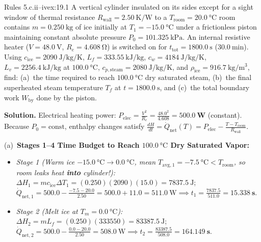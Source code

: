 \begin{workedexample}{Rules 5.c.ii--iv}{ex:19.1}
A vertical cylinder insulated on its sides except for a sight window of thermal resistance $R_{\mathrm{wall}} = \SI{2.50}{\kelvin\per\watt}$ to a $T_{\mathrm{room}} = \SI{20.0}{\celsius}$ room contains $m = \SI{0.250}{\kilogram}$ of ice initially at $T_1 = \SI{-15.0}{\celsius}$ under a frictionless piston maintaining constant absolute pressure $P_0 = \SI{101.325}{\kilo\pascal}$. An internal resistive heater ($V = \SI{48.0}{\volt}$, $R_e = \SI{4.608}{\ohm}$) is switched on for $t_{\mathrm{tot}} = \SI{1800.0}{\second}$ ($\SI{30.0}{\minute}$). Using $c_{\mathrm{ice}} = \SI{2090}{\joule\per\kilogram\per\kelvin}$, $L_f = \SI{333.55}{\kilo\joule\per\kilogram}$, $c_w = \SI{4184}{\joule\per\kilogram\per\kelvin}$, $L_v = \SI{2256.4}{\kilo\joule\per\kilogram}$ at $\SI{100.0}{\celsius}$, $c_{p,\mathrm{steam}} = \SI{2080}{\joule\per\kilogram\per\kelvin}$, and $\rho_{\mathrm{ice}} = \SI{916.7}{\kilogram\per\cubic\meter}$, find: (a)~the time required to reach $\SI{100.0}{\celsius}$ dry saturated steam, (b)~the final superheated steam temperature $T_f$ at $t = \SI{1800.0}{\second}$, and (c)~the total boundary work $W_{\mathrm{by}}$ done by the piston.
\par\smallskip\noindent
\textbf{Solution.}
Electrical heating power: $P_{\mathrm{elec}} = \frac{V^2}{R_e} = \frac{48.0^2}{4.608} = \mathbf{\SI{500.0}{\watt}}$ (constant). Because $P_0 = \text{const}$, enthalpy changes satisfy $\frac{dH}{dt} = \dot{Q}_{\mathrm{net}}(T) = P_{\mathrm{elec}} - \frac{T - T_{\mathrm{room}}}{R_{\mathrm{wall}}}$.
\par\noindent
(a)~\textbf{Stages 1--4 Time Budget to Reach $\SI{100.0}{\celsius}$ Dry Saturated Vapor:}
\begin{itemize}
  \item \emph{Stage 1 (Warm ice $\SI{-15.0}{\celsius} \to \SI{0.0}{\celsius}$, mean $T_{\mathrm{avg},1} = \SI{-7.5}{\celsius} < T_{\mathrm{room}}$, so room leaks heat \textbf{into} cylinder!):}
  $\Delta H_1 = m c_{\mathrm{ice}}\Delta T_1 = (0.250)(2090)(15.0) = \SI{7837.5}{\joule}$; $\dot{Q}_{\mathrm{net},1} = 500.0 - \frac{-7.5 - 20.0}{2.50} = 500.0 + 11.0 = \SI{511.0}{\watt} \implies t_1 = \frac{7837.5}{511.0} = \mathbf{\SI{15.338}{\second}}$.
  \item \emph{Stage 2 (Melt ice at $T_m = \SI{0.0}{\celsius}$):}
  $\Delta H_2 = m L_f = (0.250)(333550) = \SI{83387.5}{\joule}$; $\dot{Q}_{\mathrm{net},2} = 500.0 - \frac{0.0 - 20.0}{2.50} = \SI{508.0}{\watt} \implies t_2 = \frac{83387.5}{508.0} = \mathbf{\SI{164.149}{\second}}$.

\end{itemize}
\end{workedexample}
